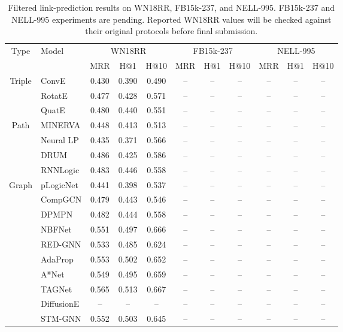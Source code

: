 \documentclass[a4paper,fleqn]{cas-sc}
\begin{document}
\begin{table}[t]
\caption{Filtered link-prediction results on WN18RR, FB15k-237, and NELL-995.
FB15k-237 and NELL-995 experiments are pending. Reported WN18RR values will be
checked against their original protocols before final submission.}
\label{tab:main_results_large}
\centering
\scriptsize
\setlength{\tabcolsep}{1.7pt}
\renewcommand{\arraystretch}{1.06}
\begin{tabular}{clccccccccc}
\toprule
\multirow{2}{*}{Type} & \multirow{2}{*}{Model}
& \multicolumn{3}{c}{WN18RR}
& \multicolumn{3}{c}{FB15k-237}
& \multicolumn{3}{c}{NELL-995} \\
\cmidrule(lr){3-5}\cmidrule(lr){6-8}\cmidrule(lr){9-11}
& & MRR & H@1 & H@10 & MRR & H@1 & H@10 & MRR & H@1 & H@10 \\
\midrule
Triple & ConvE & 0.430 & 0.390 & 0.490 & -- & -- & -- & -- & -- & -- \\
 & RotatE & 0.477 & 0.428 & 0.571 & -- & -- & -- & -- & -- & -- \\
 & QuatE & 0.480 & 0.440 & 0.551 & -- & -- & -- & -- & -- & -- \\
\midrule
Path & MINERVA & 0.448 & 0.413 & 0.513 & -- & -- & -- & -- & -- & -- \\
 & Neural LP & 0.435 & 0.371 & 0.566 & -- & -- & -- & -- & -- & -- \\
 & DRUM & 0.486 & 0.425 & 0.586 & -- & -- & -- & -- & -- & -- \\
 & RNNLogic & 0.483 & 0.446 & 0.558 & -- & -- & -- & -- & -- & -- \\
\midrule
Graph & pLogicNet & 0.441 & 0.398 & 0.537 & -- & -- & -- & -- & -- & -- \\
 & CompGCN & 0.479 & 0.443 & 0.546 & -- & -- & -- & -- & -- & -- \\
 & DPMPN & 0.482 & 0.444 & 0.558 & -- & -- & -- & -- & -- & -- \\
 & NBFNet & 0.551 & 0.497 & 0.666 & -- & -- & -- & -- & -- & -- \\
 & RED-GNN & 0.533 & 0.485 & 0.624 & -- & -- & -- & -- & -- & -- \\
 & AdaProp & 0.553 & 0.502 & 0.652 & -- & -- & -- & -- & -- & -- \\
 & A*Net & 0.549 & 0.495 & 0.659 & -- & -- & -- & -- & -- & -- \\
 & TAGNet & 0.565 & 0.513 & 0.667 & -- & -- & -- & -- & -- & -- \\
 & DiffusionE & -- & -- & -- & -- & -- & -- & -- & -- & -- \\
\midrule
 & STM-GNN & 0.552 & 0.503 & 0.645 & -- & -- & -- & -- & -- & -- \\
\bottomrule
\end{tabular}
\end{table}
\end{document}
